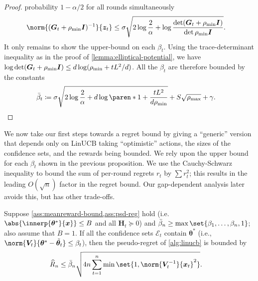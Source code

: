 \documentclass{article}
\renewcommand{\vec}[1]{\bm{#1}}
\newcommand{\defeq}{\coloneq}
\newcommand{\inv}[1]{#1^{-1}}
\renewcommand{\det}{\operatorname{det}}
\DeclarePairedDelimiter{\abs}||
\DeclarePairedDelimiter{\paren}()
\newcommand{\E}{\mathcal{E}}
\newcommand{\Eye}[1][]{\bm{I}\notblank{#1}{_{{#1}\times{#1}}}{}}
\begin{document}
\begin{proof}
  probability $1-\alpha/2$ for all rounds simultaneously
  \begin{align*}
    \norm{\inv{(\vec G_t + \rho_{\min}\Eye)}}{\vec z_t}
    &\le \sigma\sqrt{2\log\frac{2}{\alpha} + \log\frac{\det(\vec G_t+\rho_{\min}\Eye)}{\det\rho_{\min}\Eye}}.
  \end{align*}
  It only remains to show the upper-bound on each $\beta_t$.  Using the
  trace-determinant inequality as in the proof of
  \cref{lemma:elliptical-potential}, we have
  $\log\det(\vec G_t + \rho_{\min}\Eye) \le d\log(\rho_{\min} +
  tL^2/d)$.  All the $\beta_t$ are therefore bounded by the constants
  \begin{align*}
    \bar\beta_t &\defeq \sigma\sqrt{2\log\frac{2}{\alpha} + d\log\paren*{1 + \frac{tL^2}{d\rho_{\min}}}}
                 + S\sqrt{\rho_{\max}} + \gamma. \qedhere
  \end{align*}
\end{proof}

We now take our first steps towards a regret bound by giving a
``generic'' version that depends only on LinUCB taking ``optimistic''
actions, the sizes of the confidence sets, and the rewards being
bounded.  We rely upon the upper bound for each $\beta_t$ shown in the
previous proposition.  We use the Cauchy-Schwarz inequality to bound
the sum of per-round regrets $r_t$ by $\sum r_t^2$; this results in
the leading $O(\sqrt n)$ factor in the regret bound.  Our
gap-dependent analysis later avoids this, but has other trade-offs.

\begin{lemma}\label{lemma:linucb-regret}
  Suppose \cref{ass:meanreward-bound,ass:psd-reg} hold (i.e.\
  $\abs{\innerp{\vec\theta^*}{\vec x}} \le B$ and all $\vec H_t \succeq 0$)
  and $\bar\beta_n \ge \max\set{\beta_1,\dotsc,\beta_n,1}$; also assume
  that $B = 1$.  If all
  the confidence sets $\E_t$ contain $\vec\theta^*$ (i.e.,
  $\norm{\vec V_t}{\vec\theta^* - \tilde{\vec\theta}_t} \le
  \beta_t$), then the pseudo-regret of \cref{alg:linucb} is bounded by
  \begin{align*}
    \widehat{R}_n &\le \bar\beta_n\sqrt{4n \sum_{t=1}^n \min\set{1,
                   \norm{\inv{\vec V_t}}{\vec x_t}^2}}.
  \end{align*}
\end{lemma}
\end{document}
